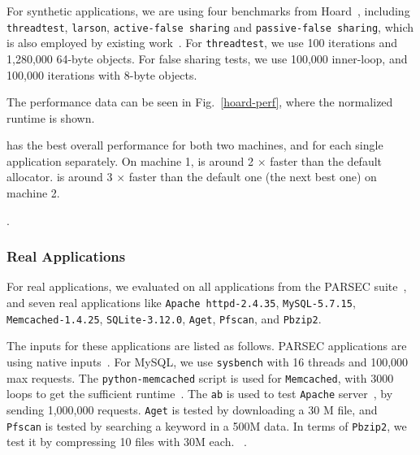 For synthetic applications, we are using four benchmarks from Hoard~\cite{Hoard}, including \texttt{threadtest}, \texttt{larson}, \texttt{active-false sharing} and \texttt{passive-false sharing}, which is also employed by existing work~\cite{Scalloc}. For \texttt{threadtest}, we use 100 iterations and 1,280,000 64-byte objects.   For false sharing tests, we use 100,000 inner-loop, and 100,000 iterations with 8-byte objects.

The performance data can be seen in Fig.~\ref{hoard-perf}, where the normalized runtime is shown. 

\NM{} has the best overall performance for both two machines, and for each single application separately. On machine 1, \NM{} is around 2 $\times$ faster than the default allocator. \NM{} is around 3 $\times$ faster than the default one (the next best one) on machine 2.  

. 
 
\subsubsection{Real Applications}
\label{sec:synthetic}

For real applications, we evaluated on all applications from the PARSEC suite~\cite{parsec}, and seven real applications like \texttt{Apache httpd-2.4.35}, \texttt{MySQL-5.7.15}, \texttt{Memcached-1.4.25}, \texttt{SQLite-3.12.0}, \texttt{Aget}, \texttt{Pfscan}, and \texttt{Pbzip2}. 

The inputs for these applications are listed as follows. PARSEC applications are using native inputs~\cite{parsec}. For MySQL, we use \texttt{sysbench} with 16 threads and 100,000 max requests. The \texttt{python-memcached} script is used for \texttt{Memcached}, with 3000 loops to get the sufficient runtime~\cite{memcached}. The  \texttt{ab} is used to test \texttt{Apache} server~\cite{apachetest}, by sending 1,000,000 requests. \texttt{Aget} is tested  by downloading a 30 M file, and \texttt{Pfscan} is tested by searching  a keyword in a 500M data. In terms of \texttt{Pbzip2}, we test it by compressing 10 files with 30M each. ~\cite{sqlitetest}. 


